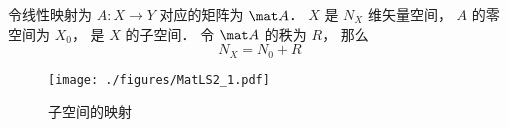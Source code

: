 

\begin{theorem}{}
令线性映射为 $A:X\to Y$ 对应的矩阵为 $\mat A$． $X$ 是 $N_X$ 维矢量空间， $A$ 的零空间为 $X_0$， 是 $X$ 的子空间． 令 $\mat A$ 的秩为 $R$， 那么
\begin{equation}
N_X = N_0 + R
\end{equation}
\end{theorem}

\begin{figure}[ht]
\centering
\texttt{[image: ./figures/MatLS2\_1.pdf]}
\caption{子空间的映射} \label{MatLS2_fig1}
\end{figure}
